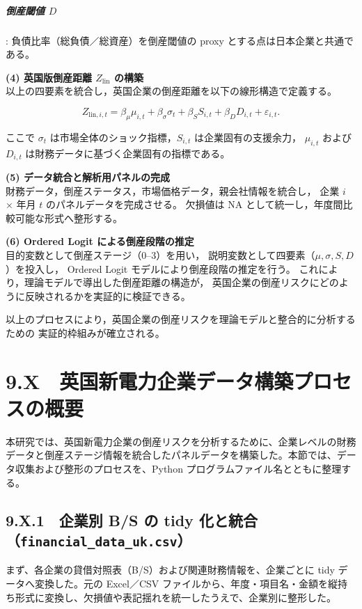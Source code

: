 \subparagraph{倒産閾値 $D$}:
負債比率（総負債／総資産）を倒産閾値の proxy とする点は日本企業と共通である。

\textbf{(4) 英国版倒産距離 $Z_{\text{lin}}$ の構築}\\
以上の四要素を統合し，英国企業の倒産距離を以下の線形構造で定義する。


\[
Z_{\text{lin},i,t}
= \beta_\mu \mu_{i,t}
+ \beta_\sigma \sigma_{t}
+ \beta_S S_{i,t}
+ \beta_D D_{i,t}
+ \varepsilon_{i,t}.
\]


ここで $\sigma_t$ は市場全体のショック指標，$S_{i,t}$ は企業固有の支援余力，
$\mu_{i,t}$ および $D_{i,t}$ は財務データに基づく企業固有の指標である。

\textbf{(5) データ統合と解析用パネルの完成}\\
財務データ，倒産ステータス，市場価格データ，親会社情報を統合し，
企業 $i$ × 年月 $t$ のパネルデータを完成させる。
欠損値は NA として統一し，年度間比較可能な形式へ整形する。

\textbf{(6) Ordered Logit による倒産段階の推定}\\
目的変数として倒産ステージ（0--3）を用い，
説明変数として四要素（$\mu, \sigma, S, D$）を投入し，
Ordered Logit モデルにより倒産段階の推定を行う。
これにより，理論モデルで導出した倒産距離の構造が，
英国企業の倒産リスクにどのように反映されるかを実証的に検証できる。

以上のプロセスにより，英国企業の倒産リスクを理論モデルと整合的に分析するための
実証的枠組みが確立される。

\section*{9.X　英国新電力企業データ構築プロセスの概要}

本研究では、英国新電力企業の倒産リスクを分析するために、企業レベルの財務データと倒産ステージ情報を統合したパネルデータを構築した。本節では、データ収集および整形のプロセスを、Python プログラムファイル名とともに整理する。

\subsection*{9.X.1　企業別 B/S の tidy 化と統合（\texttt{financial\_data\_uk.csv}）}

まず、各企業の貸借対照表（B/S）および関連財務情報を、企業ごとに tidy データへ変換した。元の Excel／CSV ファイルから、年度・項目名・金額を縦持ち形式に変換し、欠損値や表記揺れを統一したうえで、企業別に整形した。


